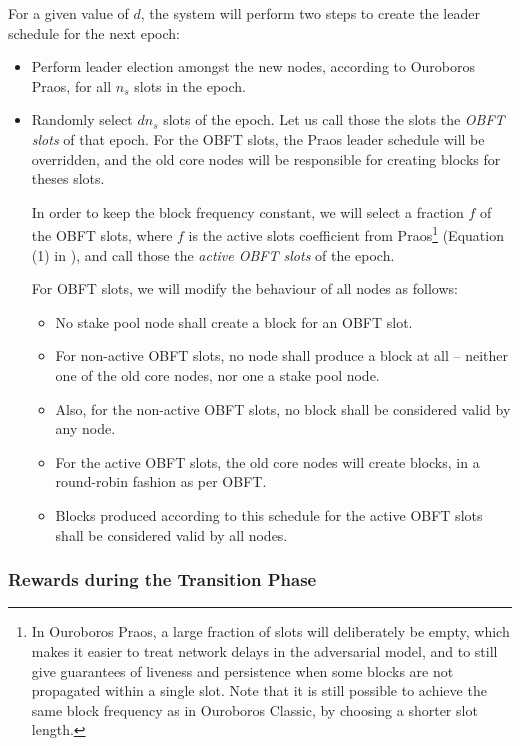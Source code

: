 \documentclass[11pt,a4paper]{article}
\begin{document}
For a given value of \(d\), the system will perform two steps to create the
leader schedule for the next epoch:
\begin{itemize}
\item Perform leader election amongst the new nodes, according to Ouroboros
  Praos, for all \(n_s\) slots in the epoch.
\item Randomly select \(d n_s\) slots of the epoch. Let us call those the slots
  the \emph{OBFT slots} of that epoch. For the OBFT slots, the Praos leader
  schedule will be overridden, and the old core nodes will be responsible for
  creating blocks for theses slots.

  In order to keep the block frequency constant, we will select a fraction
  \(f\) of the OBFT slots, where \(f\) is the active slots coefficient from
  Praos\footnote{In Ouroboros Praos, a large fraction of slots will deliberately
  be empty, which makes it easier to treat network delays in the adversarial
  model, and to still give guarantees of liveness and persistence when some
  blocks are not propagated within a single slot. Note that it is still possible
  to achieve the same block frequency as in Ouroboros Classic, by choosing a
  shorter slot length.} (Equation (1) in \citep{ouroboros_praos}), and call
  those the \emph{active OBFT slots} of the epoch.

  For OBFT slots, we will modify the behaviour of all nodes as follows:
  \begin{itemize}
  \item
    No stake pool node shall create a block for an OBFT slot.
  \item
    For non-active OBFT slots, no node shall produce a block at all -- neither
    one of the old core nodes, nor one a stake pool node.
  \item
    Also, for the non-active OBFT slots, no block shall be considered valid by
    any node.
  \item For the active OBFT slots, the old core nodes will create blocks, in a
    round-robin fashion as per OBFT.
  \item 
    Blocks produced according to this schedule for the active OBFT slots shall
    be considered valid by all nodes.
  \end{itemize}
\end{itemize}

\subsubsection{Rewards during the Transition Phase}
\label{rewards-during-the-transition-phase}
\end{document}
